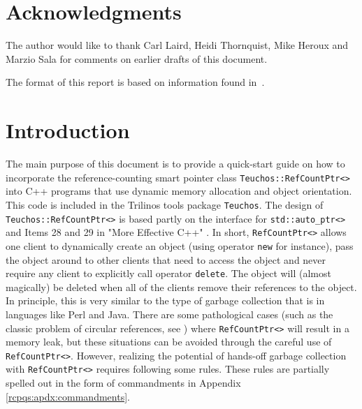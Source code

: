 \documentclass[pdf,ps2pdf,11pt]{SANDreport}
\begin{document}
\section*{Acknowledgments}

The author would like to thank Carl Laird, Heidi Thornquist, Mike
Heroux and Marzio Sala for comments on earlier drafts of this
document.

The format of this report is based on information found
in~\cite{Sand98-0730}.

%
\clearpage
\tableofcontents

%
\SANDmain %

%
\section{Introduction}
%

The main purpose of this document is to provide a quick-start guide on
how to incorporate the reference-counting smart pointer class
{}\texttt{Teuchos\-::Ref\-Count\-Ptr<>} into C++ programs that use
dynamic memory allocation and object orientation.  This code is
included in the Trilinos {}\cite{ref:Trilinos-Overview} tools package
{}\texttt{Teuchos}.  The design of
{}\texttt{Teuchos\-::Ref\-Count\-Ptr<>} is based partly on the
interface for {}\texttt{std\-::auto\-\_ptr<>} and Items 28 and 29 in
"More Effective C++" {}\cite{ref:meyers_1996}.  In short,
{}\texttt{Ref\-Count\-Ptr<>} allows one client to dynamically create
an object (using operator {}\texttt{new} for instance), pass the
object around to other clients that need to access the object and
never require any client to explicitly call operator
{}\texttt{delete}.  The object will (almost magically) be deleted when
all of the clients remove their references to the object.  In
principle, this is very similar to the type of garbage collection that
is in languages like Perl and Java.  There are some pathological cases
(such as the classic problem of circular references, see {}\cite[Item
29, page 212]{ref:meyers_1996}) where {}\texttt{Ref\-Count\-Ptr<>}
will result in a memory leak, but these situations can be avoided
through the careful use of {}\texttt{Ref\-Count\-Ptr<>}.  However,
realizing the potential of hands-off garbage collection with
{}\texttt{Ref\-Count\-Ptr<>} requires following some rules.  These
rules are partially spelled out in the form of commandments in
Appendix {}\ref{rcpqs:apdx:commandments}.
\end{document}
